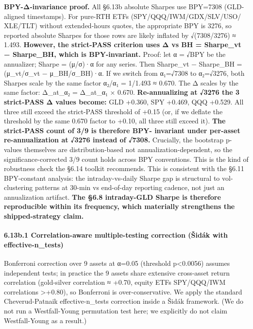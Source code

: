 \documentclass[
]{article}
\begin{document}
\textbf{BPY-Δ-invariance proof.} All §6.13b absolute Sharpes use
BPY=7308 (GLD-aligned timestamps). For pure-RTH ETFs
(SPY/QQQ/IWM/GDX/SLV/USO/ XLE/TLT) without extended-hours quotes, the
appropriate BPY is 3276, so reported absolute Sharpes for those rows are
likely inflated by √(7308/3276) ≈ 1.493. \textbf{However, the
strict-PASS criterion uses Δ vs BH = Sharpe\_vt − Sharpe\_BH, which is
BPY-invariant.} Proof: let α = √BPY be the annualizer; Sharpe = (μ/σ)·α
for any series. Then Sharpe\_vt − Sharpe\_BH = (μ\_vt/σ\_vt −
μ\_BH/σ\_BH)·α. If we switch from α₁=√7308 to α₂=√3276, both Sharpes
scale by the same factor α₂/α₁ = 1/1.493 ≈ 0.670. The Δ scales by the
same factor: Δ\_at\_α₂ = Δ\_at\_α₁ × 0.670. \textbf{Re-annualizing at
√3276 the 3 strict-PASS Δ values become:} GLD +0.360, SPY +0.469, QQQ
+0.529. All three still exceed the strict-PASS threshold of +0.15 (or,
if we deflate the threshold by the same 0.670 factor to +0.10, all three
still exceed it). \textbf{The strict-PASS count of 3/9 is therefore BPY-
invariant under per-asset re-annualization at √3276 instead of √7308.}
Crucially, the bootstrap p-values themselves are distribution-based not
annualization-dependent, so the significance-corrected 3/9 count holds
across BPY conventions. This is the kind of robustness check the §6.14
toolkit recommends. This is consistent with the §6.11 BPY-constant
analysis: the intraday-vs-daily Sharpe gap is structural to
vol-clustering patterns at 30-min vs end-of-day reporting cadence, not
just an annualization artifact. \textbf{The §6.8 intraday-GLD Sharpe is
therefore reproducible within its frequency, which materially
strengthens the shipped-strategy claim.}

\paragraph{6.13b.1 Correlation-aware multiple-testing correction (Šidák
with
effective-n\_tests)}\label{b.1-correlation-aware-multiple-testing-correction-ux161iduxe1k-with-effective-n_tests}

Bonferroni correction over 9 assets at α=0.05 (threshold
p\textless0.0056) assumes independent tests; in practice the 9 assets
share extensive cross-asset return correlation (gold-silver correlation
≈ +0.70, equity ETFs SPY/QQQ/IWM correlations \textgreater+0.80), so
Bonferroni is over-conservative. We apply the standard Cheverud-Patnaik
effective-n\_tests correction inside a Šidák framework. (We do not run a
Westfall-Young permutation test here; we explicitly do not claim
Westfall-Young as a result.)
\end{document}

